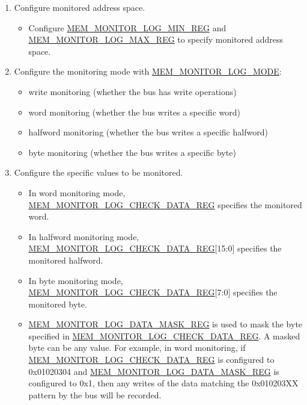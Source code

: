 \documentclass[main\_\_EN.tex]{subfiles}
\begin{document}
\begin{enumerate}

\item Configure monitored address space.
      \begin{itemize}
         \item Configure \hyperref[regdesc:MEMMONITORLOGMINREG]{MEM\_MONITOR\_LOG\_MIN\_REG} and \hyperref[regdesc:MEMMONITORLOGMAXREG]{MEM\_MONITOR\_LOG\_MAX\_REG} to specify monitored address space.
      \end{itemize}

\item Configure the monitoring mode with \hyperref[fielddesc:MEMMONITORLOGMODE]{MEM\_MONITOR\_LOG\_MODE}:
       \begin{itemize}
           \item write monitoring (whether the bus has write operations)
           \item word monitoring (whether the bus writes a specific word)
           \item halfword monitoring (whether the bus writes a specific halfword)
           \item byte monitoring (whether the bus writes a specific byte)
       \end{itemize}
       
\item Configure the specific values to be monitored.
       \begin{itemize}
            \item In word monitoring mode, \hyperref[regdesc:MEMMONITORLOGCHECKDATAREG]{MEM\_MONITOR\_LOG\_CHECK\_DATA\_REG} specifies the monitored word.
            \item In halfword monitoring mode, \hyperref[regdesc:MEMMONITORLOGCHECKDATAREG]{MEM\_MONITOR\_LOG\_CHECK\_DATA\_REG}[15:0] specifies the monitored halfword.
            \item In byte monitoring mode, \hyperref[regdesc:MEMMONITORLOGCHECKDATAREG]{MEM\_MONITOR\_LOG\_CHECK\_DATA\_REG}[7:0] specifies the monitored byte.
            \item \hyperref[regdesc:MEMMONITORLOGDATAMASKREG]{MEM\_MONITOR\_LOG\_DATA\_MASK\_REG} is used to mask the byte specified in \hyperref[regdesc:MEMMONITORLOGCHECKDATAREG]{MEM\_MONITOR\_LOG\_CHECK\_DATA\_REG}. A masked byte can be any value. For example, in word monitoring, if \hyperref[regdesc:MEMMONITORLOGCHECKDATAREG]{MEM\_MONITOR\_LOG\_CHECK\_DATA\_REG} is configured to 0x01020304 and \hyperref[regdesc:MEMMONITORLOGDATAMASKREG]{MEM\_MONITOR\_LOG\_DATA\_MASK\_REG} is configured to 0x1, then any writes of the data matching the 0x010203XX pattern by the bus will be recorded.
       \end{itemize}
       

\end{enumerate}
\end{document}
